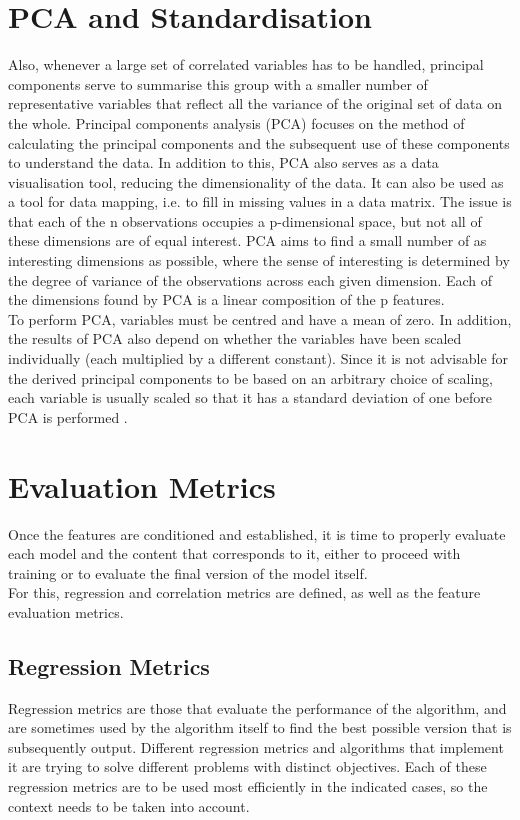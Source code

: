 \section{PCA and Standardisation}
Also, whenever a large set of correlated variables has to be handled, principal components serve to summarise this group with a smaller number of representative variables that reflect all the variance of the original set of data on the whole. Principal components analysis (PCA) focuses on the method of calculating the principal components and the subsequent use of these components to understand the data. In addition to this, PCA also serves as a data visualisation tool, reducing the dimensionality of the data. It can also be used as a tool for data mapping, i.e. to fill in missing values in a data matrix. The issue is that each of the n observations occupies a p-dimensional space, but not all of these dimensions are of equal interest. PCA aims to find a small number of as interesting dimensions as possible, where the sense of interesting is determined by the degree of variance of the observations across each given dimension. Each of the dimensions found by PCA is a linear composition of the p features.\\

To perform PCA, variables must be centred and have a mean of zero. In addition, the results of PCA also depend on whether the variables have been scaled individually (each multiplied by a different constant). Since it is not advisable for the derived principal components to be based on an arbitrary choice of scaling, each variable is usually scaled so that it has a standard deviation of one before PCA is performed \cite{James2013}. 




\section{Evaluation Metrics}
Once the features are conditioned and established, it is time to properly evaluate each model and the content that corresponds to it, either to proceed with training or to evaluate the final version of the model itself.\\

For this, regression and correlation metrics are defined, as well as the feature evaluation metrics. 

\subsection{Regression Metrics}
Regression metrics are those that evaluate the performance of the algorithm, and are sometimes used by the algorithm itself to find the best possible version that is subsequently output.
Different regression metrics and algorithms that implement it are trying to solve different problems with distinct objectives. Each of these regression metrics are to be used most efficiently in the indicated cases, so the context needs to be taken into account. 
